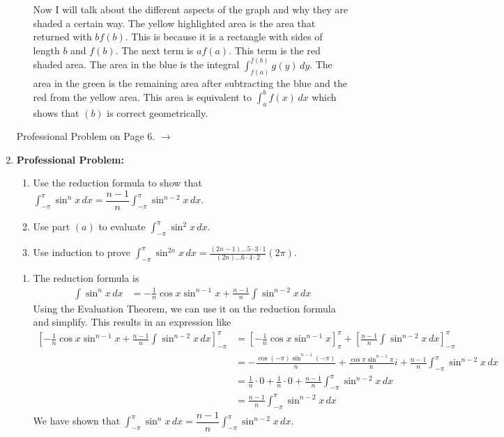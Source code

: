 \documentclass{article}
\begin{document}
\begin{enumerate}[label=\textbf{(4.\arabic*)}]
\begin{enumerate}
\begin{figure}[H]
    \end{figure}
    Now I will talk about the different aspects of the graph and why they are shaded a certain way. The yellow highlighted area is the area that returned with $bf(b)$. This is because it is a rectangle with sides of length $b$ and $f(b)$. The next term is $af(a)$. This term is the red shaded area. The area in the blue is the integral $\displaystyle{\int_{f(a)}^{f(b)}\!g(y)\,dy}$.
    The area in the green is the remaining area after subtracting the blue and the red from the yellow area. This area is equivalent to $\displaystyle{\int_a^b\!f(x)\,dx}$ which shows that $(b)$ is correct geometrically.
\end{enumerate}
\begin{center}
    Professional Problem on Page 6. $\rightarrow$
\end{center}


\newpage


\item \textbf{Professional Problem:}
\begin{enumerate}
    \item Use the reduction formula to show that $\int_{-\pi}^{\pi}\!\sin^nx\,dx=\dfrac{n-1}{n}\int_{-\pi}^{\pi}\sin^{n-2}x\,dx$.
    \item Use part $(a)$ to evaluate $\int_{-\pi}^{\pi}\sin^2x\,dx$.
    \item Use induction to prove $\int_{-\pi}^{\pi}\sin^{2n}x\,dx=\frac{(2n-1)...5\cdot3\cdot1}{(2n)...6\cdot4\cdot2}(2\pi)$.
\end{enumerate}

\begin{enumerate}
    
    \item The reduction formula is 
    \begin{align*}
        \int\!\sin^nx\,dx&=-\frac{1}{n}\cos x\sin^{n-1}x+\frac{n-1}{n}\int\!\sin^{n-2}x\,dx
    \end{align*}
    Using the Evaluation Theorem, we can use it on the reduction formula and simplify. This results in an expression like
    \begin{align*}
        \left[-\frac{1}{n}\cos x\sin^{n-1}x+\frac{n-1}{n}\int\!\sin^{n-2}x\,dx\right]_{-\pi}^{\pi}&=\left[-\frac{1}{n}\cos x\sin^{n-1}x\right]_{\pi}^\pi+\left[\frac{n-1}{n}\int\!\sin^{n-2}x\,dx\right]_{-\pi}^\pi \\
        &=-\frac{\cos (-\pi)\sin^{n-1}(-\pi)}{n}+\frac{\cos \pi\sin^{n-1}\pi}{n}i+\frac{n-1}{n}\int_{-\pi}^{\pi}\!\sin^{n-2}x\,dx \\
        &=\frac{1}{n}\cdot0+\frac{1}{n}\cdot0+\frac{n-1}{n}\int_{-\pi}^{\pi}\!\sin^{n-2}x\,dx \\
        &=\frac{n-1}{n}\int_{-\pi}^{\pi}\!\sin^{n-2}x\,dx
    \end{align*}
    We have shown that $\int_{-\pi}^{\pi}\!\sin^nx\,dx=\dfrac{n-1}{n}\int_{-\pi}^{\pi}\sin^{n-2}x\,dx$.


\end{enumerate}
\end{enumerate}
\end{document}
